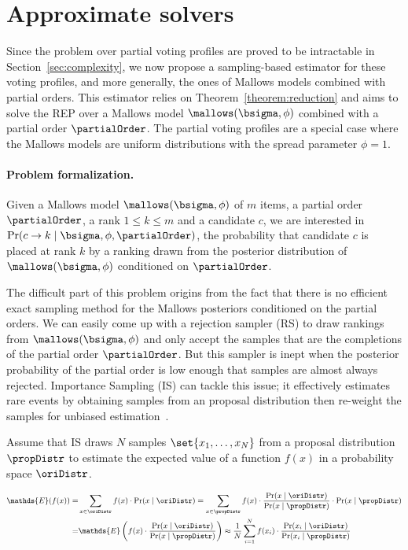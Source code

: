 \section{Approximate solvers}
\label{sec:approx}

Since the \esc problem over partial voting profiles are proved to be intractable in Section~\ref{sec:complexity}, we now propose a sampling-based estimator for these voting profiles, and more generally, the ones of Mallows models combined with partial orders.
This estimator relies on Theorem~\ref{theorem:reduction} and aims to solve the REP over a Mallows model $\mallows(\bsigma, \phi)$ combined with a partial order $\partialOrder$.
The partial voting profiles are a special case where the Mallows models are uniform distributions with the spread parameter $\phi=1$.

\paragraph{Problem formalization.}
Given a Mallows model $\mallows(\bsigma, \phi)$ of $m$ items, a partial order $\partialOrder$, a rank $1 \leq k \leq m$ and a candidate $c$, we are interested in $\Pr(c \rightarrow k \mid \bsigma, \phi, \partialOrder)$, the probability that candidate $c$ is placed at rank $k$ by a ranking drawn from the posterior distribution of $\mallows(\bsigma, \phi)$ conditioned on $\partialOrder$.

The difficult part of this problem origins from the fact that there is no efficient exact sampling method for the Mallows posteriors conditioned on the partial orders. We can easily come up with a rejection sampler (RS) to draw rankings from $\mallows(\bsigma, \phi)$ and only accept the samples that are the completions of the partial order $\partialOrder$. But this sampler is inept when the posterior probability of the partial order is low enough that samples are almost always rejected.  Importance Sampling (IS) can tackle this issue; it effectively estimates rare events by obtaining samples from an proposal distribution then re-weight the samples for unbiased estimation~\cite{kahn1950random1, kahn1950random2}.

Assume that IS draws $N$ samples $\set{x_1, \ldots, x_N}$ from a proposal distribution $\propDistr$ to estimate the expected value of a function $f(x)$ in a probability space $\oriDistr$.

\begin{equation}\label{eq:importance_sampling}
\small 
\begin{split}
  \mathds{E}(f(x)) 
  =& \sum_{x \in \oriDistr} {f(x) \cdot \Pr(x \mid \oriDistr)} 
  = \sum_{x \in \propDistr} {f(x) \cdot \frac{\Pr(x \mid \oriDistr)}{\Pr(x \mid \propDistr)} \cdot \Pr(x \mid \propDistr)} \\
  =& \mathds{E}\left( f(x) \cdot \frac{\Pr(x \mid \oriDistr)}{\Pr(x \mid \propDistr)} \right)
  \approx \frac{1}{N} \sum_{i=1}^{N} {f(x_i) \cdot \frac{\Pr(x_i \mid \oriDistr)}{\Pr(x_i \mid \propDistr)}}
\end{split}
\end{equation}

